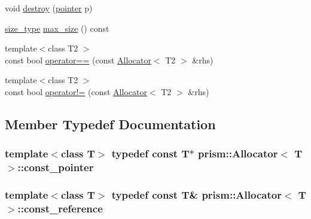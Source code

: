 \begin{DoxyCompactItemize}
\item 
void \hyperlink{classprism_1_1_allocator_a660832107a9bc094324adf9da718fa43}{destroy} (\hyperlink{classprism_1_1_allocator_ad3c6706a7243bd3ef489e16d34d5750f}{pointer} p)
\item 
\hyperlink{classprism_1_1_allocator_a47cb9435e4e9ff4c934ea3d4b4338d52}{size\+\_\+type} \hyperlink{classprism_1_1_allocator_adc3d03562ab64759d8a48a191ff344d8}{max\+\_\+size} () const 
\item 
{\footnotesize template$<$class T2 $>$ }\\const bool \hyperlink{classprism_1_1_allocator_a6e4d64dc74ef98bae3cb13eef532116c}{operator==} (const \hyperlink{classprism_1_1_allocator}{Allocator}$<$ T2 $>$ \&rhs)
\item 
{\footnotesize template$<$class T2 $>$ }\\const bool \hyperlink{classprism_1_1_allocator_aa1b7baa61a8e3938861dc0e9e9d369a5}{operator!=} (const \hyperlink{classprism_1_1_allocator}{Allocator}$<$ T2 $>$ \&rhs)
\end{DoxyCompactItemize}


\subsection{Member Typedef Documentation}
\subsubsection[{\texorpdfstring{const\+\_\+pointer}{const_pointer}}]{\setlength{\rightskip}{0pt plus 5cm}template$<$class T$>$ typedef const T$\ast$ {\bf prism\+::\+Allocator}$<$ T $>$\+::{\bf const\+\_\+pointer}}\hypertarget{classprism_1_1_allocator_af6a4a91dfc203203ecc319a457ce4dce}{}\label{classprism_1_1_allocator_af6a4a91dfc203203ecc319a457ce4dce}
\subsubsection[{\texorpdfstring{const\+\_\+reference}{const_reference}}]{\setlength{\rightskip}{0pt plus 5cm}template$<$class T$>$ typedef const T\& {\bf prism\+::\+Allocator}$<$ T $>$\+::{\bf const\+\_\+reference}}\hypertarget{classprism_1_1_allocator_a89911899c97ae877a81b798957a2d899}{}\label{classprism_1_1_allocator_a89911899c97ae877a81b798957a2d899}
